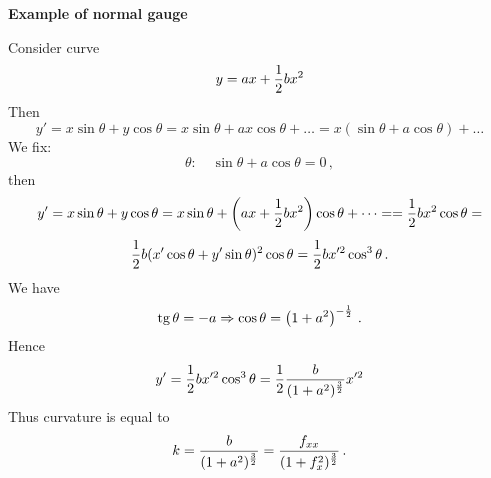 




 

\baselineskip=14pt
\def\vare {\varepsilon}
\def\t {\tilde}
\def\a {\alpha}
\def\K {{\bf K}}
\def\N {{\bf N}}
\def\C {{\cal C}}
\def\L {{\cal L}}
\def\E {{\cal E}}
\def\s {{\sigma}}
\def\S {{\Sigma}}
\def\p{\partial}
\def\vare{{\varepsilon}}
\def\Q {{\bf Q}}
\def\D {{\cal D}}
\def\G {{\Gamma}}
\def\Z {{\bf Z}}
\def\R  {{\bf R}}
\def\l {\lambda}
\def\ll {{\bf l}}
\def\degree {{\bf {\rm degree}\,\,}}
\def \finish {${\,\,\vrule height1mm depth2mm width 8pt}$}
\def \m {\medskip}
\def\p {\partial}
\def\r {{\bf r}}
\def\pt {{\bf p}}
\def\v {{\bf v}}
\def\n {{\bf n}}
\def\t {{\bf t}}
\def\b {{\bf b}}
\def\c {{\bf c }}
\def\e{{\bf e}}
\def\f{{\bf f}}
\def\ac {{\bf a}}
\def \X   {{\bf X}}
\def \Y   {{\bf Y}}
\def \x   {{\bf x}}
\def \y   {{\bf y}}
\def\w {{\omega}}
\def \Tr  {{\rm Tr\,}}
\def\dim {{\rm dim\,\,}}
\def\t {{\tilde}} 
\def\dist {{\hbox{\tt "distance"}}}


{\bf Example of normal gauge}

Consider curve
      $$
    y=ax+{1\over 2}bx^2
      $$
Then
    $$
y'=x\sin\theta+y\cos\theta=x\sin\theta+ax\cos\theta+\dots=
  x(\sin\theta+a\cos\theta)+\dots
    $$
We fix:
        $$
\theta\colon\quad \sin\theta+a\cos\theta=0\,,
        $$
then  $$
y'=x\sin\theta+y\cos\theta=x\sin\theta+
\left(ax+{1\over 2}bx^2\right)\cos\theta+\dots=
 ={1\over 2}bx^2\cos\theta=
    $$
      $$
{1\over 2}b(x'\cos\theta+y'\sin\theta)^2\cos\theta=
 {1\over 2}bx'^2\cos^3\theta\,.
      $$
   We have
     $$
{\rm tg\,}\theta=-a\Rightarrow \cos\theta =
\left(1+a^2\right)^{-{1\over 2}}\,.
     $$
 Hence
      $$
y'={1\over 2}bx'^2\cos^3\theta={1\over 2}
{b\over (1+a^2)^{3\over 2}}x'^2
      $$       
Thus curvature is equal to
    $$
k=
{b\over (1+a^2)^{3\over 2}}={f_{xx}\over (1+f_x^2)^{3\over 2}}\,.
      $$

\bye
